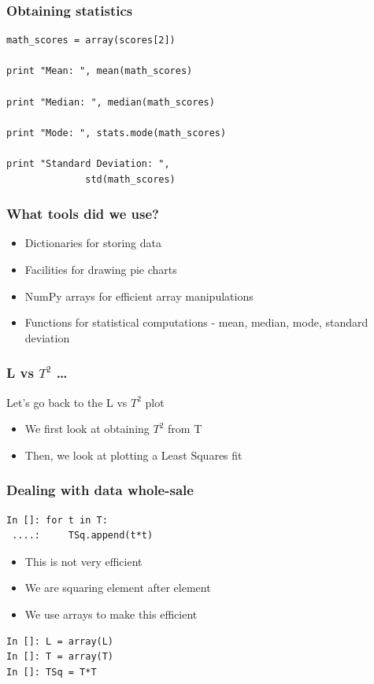 \documentclass[14pt,compress]{beamer}
\begin{document}
\begin{frame}[fragile]
  \frametitle{Obtaining statistics}
  \begin{lstlisting}
math_scores = array(scores[2])

print "Mean: ", mean(math_scores)

print "Median: ", median(math_scores)

print "Mode: ", stats.mode(math_scores)

print "Standard Deviation: ",
              std(math_scores)
  \end{lstlisting}
\end{frame}

\begin{frame}[fragile]
  \frametitle{What tools did we use?}
  \begin{itemize}
   \item Dictionaries for storing data
   \item Facilities for drawing pie charts
   \item NumPy arrays for efficient array manipulations
   \item Functions for statistical computations - mean, median, mode, standard deviation
  \end{itemize}
\end{frame}

\begin{frame}
\frametitle{L vs $T^2$ \ldots}
Let's go back to the L vs $T^2$ plot
\begin{itemize}
\item We first look at obtaining $T^2$ from T
\item Then, we look at plotting a Least Squares fit
\end{itemize}
\end{frame}

\begin{frame}[fragile]
\frametitle{Dealing with data whole-sale}
\begin{lstlisting}
In []: for t in T:
 ....:     TSq.append(t*t)
\end{lstlisting}
\begin{itemize}
\item This is not very efficient
\item We are squaring element after element
\item We use arrays to make this efficient
\end{itemize}
\begin{lstlisting}
In []: L = array(L)
In []: T = array(T)
In []: TSq = T*T
\end{lstlisting}
\end{frame}
\end{document}
